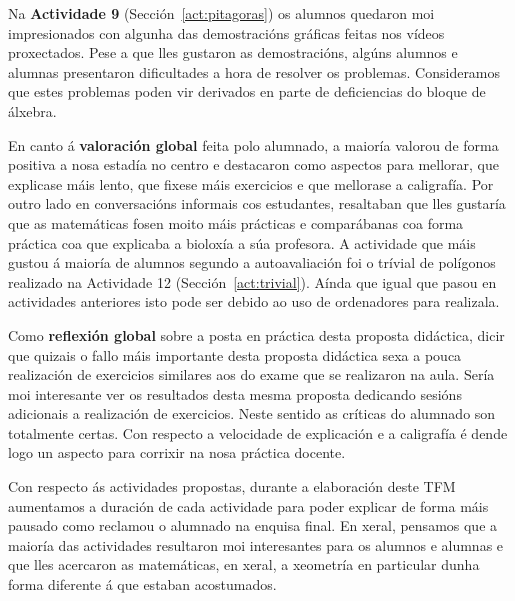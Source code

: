 Na \textbf{Actividade 9} (Sección~\ref{act:pitagoras}) os alumnos quedaron moi impresionados con algunha das demostracións gráficas feitas nos vídeos proxectados. Pese a que lles gustaron as demostracións, algúns alumnos e alumnas presentaron dificultades a hora de resolver os problemas. Consideramos que estes problemas poden vir derivados en parte de deficiencias do bloque de álxebra.

En canto á \textbf{valoración global} feita polo alumnado, a maioría valorou de forma positiva a nosa estadía no centro e destacaron como aspectos para mellorar, que explicase máis lento, que fixese máis exercicios e que mellorase a caligrafía. Por outro lado en conversacións informais cos estudantes, resaltaban que lles gustaría que as matemáticas fosen moito máis prácticas e comparábanas coa forma práctica coa que explicaba a bioloxía a súa profesora. A actividade que máis gustou á maioría de alumnos segundo a autoavaliación foi o trívial de polígonos realizado na Actividade 12 (Sección~\ref{act:trivial}). Aínda que igual que pasou en actividades anteriores isto pode ser debido ao uso de ordenadores para realizala.

Como \textbf{reflexión global} sobre a posta en práctica desta proposta didáctica, dicir que quizais o fallo máis importante desta proposta didáctica sexa a pouca realización de exercicios similares aos do exame que se realizaron na aula. Sería moi interesante ver os resultados desta mesma proposta dedicando sesións adicionais a realización de exercicios. Neste sentido as críticas do alumnado son totalmente certas. Con respecto a velocidade de explicación e a caligrafía é dende logo un aspecto para corrixir na nosa práctica docente.

Con respecto ás actividades propostas, durante a elaboración deste TFM aumentamos a duración de cada actividade para poder explicar de forma máis pausado como reclamou o alumnado na enquisa final. En xeral, pensamos que a maioría das actividades resultaron moi interesantes para os alumnos e alumnas e que lles acercaron as matemáticas, en xeral, a xeometría en particular dunha forma diferente á que estaban acostumados.
